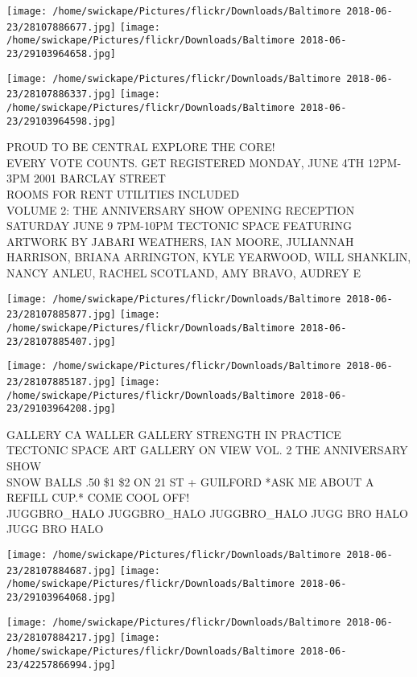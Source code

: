 \documentclass[10pt,letterpaper]{article}
\begin{document}
\texttt{[image: /home/swickape/Pictures/flickr/Downloads/Baltimore 2018-06-23/28107886677.jpg]}
\texttt{[image: /home/swickape/Pictures/flickr/Downloads/Baltimore 2018-06-23/29103964658.jpg]}

\texttt{[image: /home/swickape/Pictures/flickr/Downloads/Baltimore 2018-06-23/28107886337.jpg]}
\texttt{[image: /home/swickape/Pictures/flickr/Downloads/Baltimore 2018-06-23/29103964598.jpg]}

PROUD TO BE CENTRAL EXPLORE THE CORE!\\
EVERY VOTE COUNTS.  GET REGISTERED MONDAY, JUNE 4TH 12PM{-}3PM 2001 BARCLAY STREET\\
ROOMS FOR RENT  UTILITIES INCLUDED\\
VOLUME 2: THE ANNIVERSARY SHOW OPENING RECEPTION SATURDAY JUNE 9 7PM{-}10PM TECTONIC SPACE FEATURING ARTWORK BY JABARI WEATHERS, IAN MOORE, JULIANNAH HARRISON, BRIANA ARRINGTON, KYLE YEARWOOD, WILL SHANKLIN, NANCY ANLEU, RACHEL SCOTLAND, AMY BRAVO, AUDREY E\\
\pagebreak

\texttt{[image: /home/swickape/Pictures/flickr/Downloads/Baltimore 2018-06-23/28107885877.jpg]}
\texttt{[image: /home/swickape/Pictures/flickr/Downloads/Baltimore 2018-06-23/28107885407.jpg]}

\texttt{[image: /home/swickape/Pictures/flickr/Downloads/Baltimore 2018-06-23/28107885187.jpg]}
\texttt{[image: /home/swickape/Pictures/flickr/Downloads/Baltimore 2018-06-23/29103964208.jpg]}

GALLERY CA WALLER GALLERY STRENGTH IN PRACTICE\\
TECTONIC SPACE ART GALLERY ON VIEW VOL. 2 THE ANNIVERSARY SHOW\\
SNOW BALLS .50 \$1 \$2 ON 21 ST + GUILFORD *ASK ME ABOUT A REFILL CUP.* COME COOL OFF!\\
JUGGBRO\_HALO JUGGBRO\_HALO JUGGBRO\_HALO JUGG BRO HALO JUGG BRO HALO\\
\pagebreak

\texttt{[image: /home/swickape/Pictures/flickr/Downloads/Baltimore 2018-06-23/28107884687.jpg]}
\texttt{[image: /home/swickape/Pictures/flickr/Downloads/Baltimore 2018-06-23/29103964068.jpg]}

\texttt{[image: /home/swickape/Pictures/flickr/Downloads/Baltimore 2018-06-23/28107884217.jpg]}
\texttt{[image: /home/swickape/Pictures/flickr/Downloads/Baltimore 2018-06-23/42257866994.jpg]}
\end{document}
